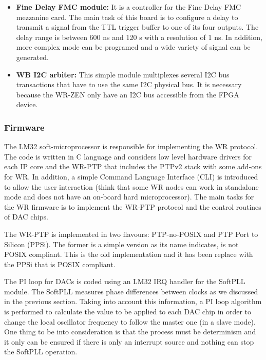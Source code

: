 \begin{itemize}
{	%
	}
	\item{\textbf{Fine Delay FMC module:} It is a controller for the Fine Delay FMC mezzanine card. The main task of this board is to configure a delay to transmit a signal from the TTL trigger buffer to one of its four outputs. The delay range is between 600 ns and 120 s with a resolution of 1 ns. In addition, more complex mode can be programed and a wide variety of signal can be generated.}
	\item{\textbf{WB I2C arbiter:} This simple module multiplexes several I2C bus transactions that have to use the same I2C physical bus. It is necessary because the WR-ZEN only have an I2C bus accessible from the FPGA device.}
\end{itemize}

\subsubsection{Firmware}

The LM32 soft-microprocessor is responsible for implementing the WR protocol. 
The code is written in C language and considers low level hardware drivers for 
each IP core and the WR-PTP that includes the PTPv2 stack with some add-ons for WR. In 
addition, a simple Command Language Interface (CLI) is introduced to allow the 
user interaction (think that some WR nodes can work in standalone mode and does 
not have an on-board hard microprocessor). The main tasks for the WR firmware 
is to implement the WR-PTP protocol and the control routines of DAC chips. 

The WR-PTP is implemented in two flavours: PTP-no-POSIX and PTP Port to Silicon 
(PPSi). The former is a simple version as its name indicates, is not POSIX 
compliant. This is the old implementation and it has been replace with the PPSi 
that is POSIX compliant.

The PI loop for DACs is coded using an LM32 IRQ handler for the SoftPLL module. The SoftPLL measures phase differences between clocks as we discussed in the previous section. Taking into account this information, a PI loop algorithm is performed to calculate the value to be applied to each DAC chip in order to change the local oscillator frequency to follow the master one (in a slave mode). One thing to be into consideration is that the process must be determinism and it only can be ensured if there is only an interrupt source and nothing can stop the SoftPLL operation.

